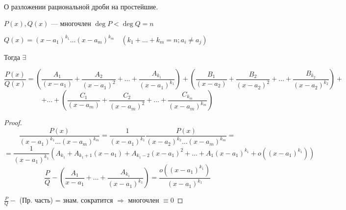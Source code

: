 \begin{theorem}
    О разложении рациональной дроби на простейшие.

    $P(x), Q(x)$ --- многочлен $\deg P<\deg Q=n$

    $Q(x)=(x-a_1)^{k_1}\ldots (x-a_m)^{k_m} \quad (k_1+\ldots+k_m=n; a_i\not= a_j)$

    Тогда $\exists$

    $$\frac{P(x)}{Q(x)}=\left( \frac{A_1}{(x-a_1)}+\frac{A_2}{(x-a_1)^2}+\ldots+\frac{A_{k_1}}{(x-a_1)^{k_1}} \right)+\left( \frac{B_1}{(x-a_2)}+\frac{B_2}{(x-a_2)^2}+\ldots+\frac{B_{k_2}}{(x-a_2)^{k_2}} \right)+$$
    $$+\ldots+\left( \frac{C_1}{(x-a_m)}+\frac{C_2}{(x-a_m)^2}+\ldots+\frac{C_{k_m}}{(x-a_m)^{k_m}} \right)$$
\end{theorem}
\begin{proof}
    $$\frac{P(x)}{(x-a_1)^{k_1}\ldots(x-a_m)^{k_m}}=\frac{1}{(x-a_1)^{k_1}}\frac{P(x)}{(x-a_2)^{k_2}\ldots(x-a_m)^{k_m}}=$$
    $$=\frac{1}{(x-a_1)^{k_1}}(A_{k_1}+A_{k_1+1}(x-a_1)+A_{k_1-2}(x-a_1)^2+\ldots+A_1(x-a_1)^{k_1}+o((x-a_1)^{k_1}))$$
    $$\frac{P}{Q}-\left(\frac{A_1}{x-a_1}+\ldots+\frac{A_{k_1}}{(x-a_1)^{k_1}} \right)=\frac{o((x-a_1)^{k_1})}{(x-a_1)^{k_1}}$$

    $\frac{P}{Q} - $ (Пр. часть) = знам. сократится $\Rightarrow$ многочлен $\equiv 0$
\end{proof}
